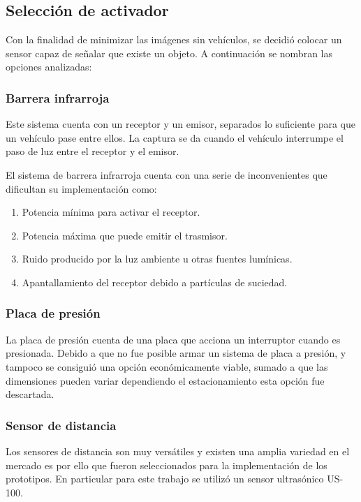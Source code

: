 \subsection{Selección de activador}

Con la finalidad de minimizar las imágenes sin vehículos, se decidió colocar un sensor capaz de señalar que existe un objeto. A continuación se nombran las opciones analizadas:

\subsubsection*{Barrera infrarroja}

Este sistema cuenta con un receptor y un emisor, separados lo suficiente para que un vehículo pase entre ellos. La captura se da cuando el vehículo interrumpe el paso de luz entre el receptor y el emisor.

El sistema de barrera infrarroja cuenta con una serie de inconvenientes que dificultan su implementación como:

\begin{enumerate}
    \item Potencia mínima para activar el receptor.
    \item Potencia máxima que puede emitir el trasmisor.
    \item Ruido producido por la luz ambiente u otras fuentes lumínicas.
    \item Apantallamiento del receptor debido a partículas de suciedad.
\end{enumerate}

\subsubsection*{Placa de presión}

La placa de presión cuenta de una placa que acciona un interruptor cuando es presionada. Debido a que no fue posible armar un sistema de placa a presión, y tampoco se consiguió una opción económicamente viable, sumado a que las dimensiones pueden variar dependiendo el estacionamiento esta opción fue descartada.

\subsubsection*{Sensor de distancia}

Los sensores de distancia son muy versátiles y existen una amplia variedad en el mercado es por ello que fueron seleccionados para la implementación de los prototipos.
En particular para este trabajo se utilizó un sensor ultrasónico US-100.

